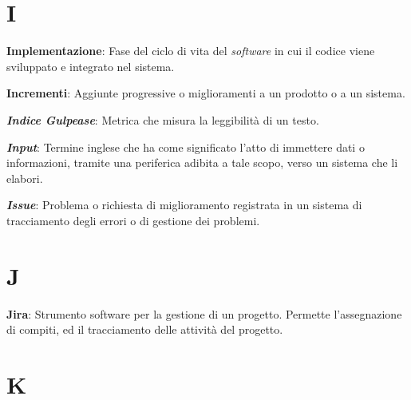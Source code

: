 \documentclass[5pt]{article}
\begin{document}
\section*{I}
\begin{flushleft}

\textbf{Implementazione}: Fase del ciclo di vita del \textit{software} in cui il codice viene sviluppato e integrato nel sistema.\newline

\textbf{Incrementi}: Aggiunte progressive o miglioramenti a un prodotto o a un sistema.\newline

\textbf{\textit{Indice Gulpease}}: Metrica che misura la leggibilità di un testo.\newline

\textbf{\textit{Input}}: Termine inglese che ha come significato l'atto di immettere dati o informazioni, tramite una periferica adibita a tale scopo, verso un sistema che li elabori.\newline

\textbf{\textit{Issue}}: Problema o richiesta di miglioramento registrata in un sistema di tracciamento degli errori o di gestione dei problemi.\newline


\end{flushleft}

\pagebreak

\section*{J}
\begin{flushleft}
	\textbf{Jira}: Strumento software per la gestione di un progetto. Permette l'assegnazione di compiti, ed il tracciamento delle attività del progetto.  \newline
\end{flushleft}

\pagebreak

\section*{K}
\begin{flushleft}
	
\end{flushleft}
\end{document}
